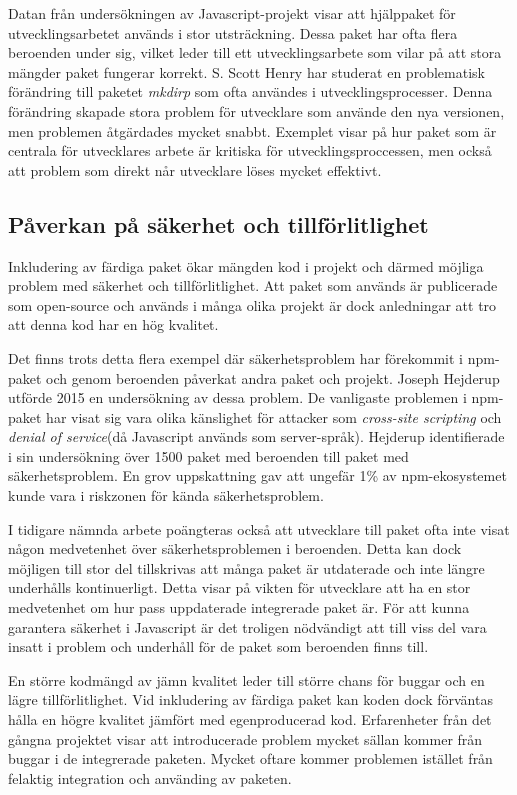 Datan från undersökningen av Javascript-projekt visar att hjälppaket för utvecklingsarbetet används i stor utsträckning. Dessa paket har ofta flera beroenden under sig, vilket leder till ett utvecklingsarbete som vilar på att stora mängder paket fungerar korrekt. S. Scott Henry har studerat en problematisk förändring till paketet \textit{mkdirp} som ofta användes i utvecklingsprocesser.\cite{Henry2017} Denna förändring skapade stora problem för utvecklare som använde den nya versionen, men problemen åtgärdades mycket snabbt. Exemplet visar på hur paket som är centrala för utvecklares arbete är kritiska för utvecklingsproccessen, men också att problem som direkt når utvecklare löses mycket effektivt.

\subsection{Påverkan på säkerhet och tillförlitlighet}
Inkludering av färdiga paket ökar mängden kod i projekt och därmed möjliga problem med säkerhet och tillförlitlighet. Att paket som används är publicerade som open-source och används i många olika projekt är dock anledningar att tro att denna kod har en hög kvalitet.

Det finns trots detta flera exempel där säkerhetsproblem har förekommit i npm-paket och genom beroenden påverkat andra paket och projekt. Joseph Hejderup utförde 2015 en undersökning av dessa problem.\cite{Hejderup2017} De vanligaste problemen i npm-paket har visat sig vara olika känslighet för attacker som \textit{cross-site scripting} och \textit{denial of service}(då Javascript används som server-språk). Hejderup identifierade i sin undersökning över 1500 paket med beroenden till paket med säkerhetsproblem. En grov uppskattning gav att ungefär 1\% av npm-ekosystemet kunde vara i riskzonen för kända säkerhetsproblem.

I tidigare nämnda arbete poängteras också att utvecklare till paket ofta inte visat någon medvetenhet över säkerhetsproblemen i beroenden. Detta kan dock möjligen till stor del tillskrivas att många paket är utdaterade och inte längre underhålls kontinuerligt. Detta visar på vikten för utvecklare att ha en stor medvetenhet om hur pass uppdaterade integrerade paket är. För att kunna garantera säkerhet i Javascript är det troligen nödvändigt att till viss del vara insatt i problem och underhåll för de paket som beroenden finns till.

En större kodmängd av jämn kvalitet leder till större chans för buggar och en lägre tillförlitlighet. Vid inkludering av färdiga paket kan koden dock förväntas hålla en högre kvalitet jämfört med egenproducerad kod. Erfarenheter från det gångna projektet visar att introducerade problem mycket sällan kommer från buggar i de integrerade paketen. Mycket oftare kommer problemen istället från felaktig integration och använding av paketen.

